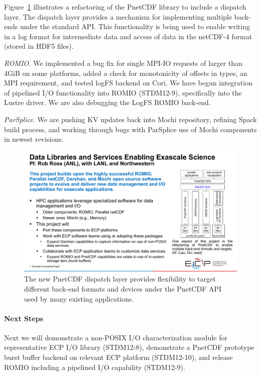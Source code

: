 Figure~\ref{fig:pnetcdf} illustrates a refactoring of the PnetCDF
library to include a dispatch layer. The dispatch layer provides a
mechanism for implementing multiple back-ends under the standard
API. This functionality is being used to enable writing in a log
format for intermediate data and access of data in the netCDF-4 format
(stored in HDF5 files).

\emph{ROMIO.}
We implemented a bug fix for single MPI-IO requests of larger than 4GiB on some
platforms, added a check for monotonicity of offsets in types, an MPI
requirement, and tested logFS backend on Cori. We have begun integration
of pipelined I/O functionality into ROMIO (STDM12-9), specifically
into the Lustre driver. We are also debugging the LogFS ROMIO back-end.

\emph{ParSplice.}
We are pushing KV updates back into Mochi repository, refining Spack build
process, and working through bugs with ParSplice use of Mochi
components in newest revisions.

\begin{figure}[htb]
        \centering
        \includegraphics[height=2.5in]{projects/2.3.4-DataViz/2.3.4.10-DataLib/pnetcdf-figure.pdf}
        \caption{\label{fig:pnetcdf} The new PnetCDF dispatch layer provides flexibility to target different back-end formats and devices under the PnetCDF API used by many existing applications.
        }
\end{figure}

\paragraph{Next Steps}
%
Next we will demonstrate a non-POSIX I/O characterization module for
representative ECP I/O library (STDM12-8), demonstrate a PnetCDF
prototype burst buffer backend on relevant ECP platform (STDM12-10),
and release ROMIO including a pipelined I/O capability (STDM12-9).
